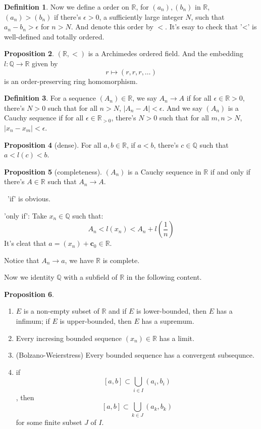 \documentclass[12pt,a4paper]{book}
\newenvironment{prooff}{{\noindent\it\textcolor{cyan!40!black}{Proof}:}\,}{\par}
\newcommand{\bb}[1]{\mathbb{#1}}
\newenvironment{enu}{\begin{enumerate}[(1)]}{\end{enumerate}}
\theoremstyle{definition}
\newtheorem{defn}{Definition}[section]
\newtheorem{prop}[defn]{Proposition}
\begin{document}
\begin{defn}
    Now we define a order on $\bb{R}$, for $(a_n),(b_n)$ in $\bb{R}$, $(a_n)>(b_n)$ if  there's $\epsilon>0$, a sufficiently large integer $N$, such that $a_n-b_n>\epsilon$ for $n>N$. And denote this order by $<$. It's esay to check that '<' is well-defined and
    totally ordered.
\end{defn}
\begin{prop}
    $(\bb{R},<)$ is a Archimedes ordered field. And the embedding $l:\bb{Q}\rightarrow \bb{R}$ given by
    \begin{equation*}
        r\mapsto (r,r,r,\dots)
    \end{equation*}
    is an order-preserving ring homomorphism.
\end{prop}
\begin{defn}
    For a sequence $(A_n)\in \bb{R}$, we say $A_n\rightarrow A$ if for all $\epsilon\in\bb{R}>0$, there's $N>0$ such that for all $n>N$, $|A_n-A|<\epsilon$. And we say $(A_n)$ is a Cauchy sequence if for all $\epsilon \in \bb{R}_{>0}$, there's $N>0$ such that for all $m,n>N$, $|x_n-x_m|<\epsilon$.
\end{defn}
\begin{prop}[dense]
    For all $a,b\in \bb{R}$, if $a<b$, there's $c\in \bb{Q}$ such that $a<l(c)<b$.
\end{prop}
\begin{prop}[completeness]
    $(A_n)$ is a Cauchy sequence in $\bb{R}$ if and only if there's $A\in \bb{R}$ such that $A_n\rightarrow A$.
\end{prop}
\begin{prooff}
    'if' is obvious.

    'only if': Take $x_n\in \mathbb{Q}$ such that:
    $$
        A_n<l(x_n)<A_n+l(\frac{1}{n})
    $$
    It's cleat that $a=(x_n)+\mathbf{c}_0\in \mathbb{R}$.

    Notice that $A_n\rightarrow a$, we have $\bb{R}$ is complete.
\end{prooff}

\vskip 1cm
Now we identity $\bb{Q}$ with a subfield of $\bb{R}$ in the following content.

\begin{prop}
    \begin{enu}
        \item $E$ is a non-empty subset of $\bb{R}$ and if $E$ is lower-bounded, then $E$ has a infimum; if $E$ is upper-bounded, then $E$ has a supremum.
        \item Every incresing bounded sequence $(x_n)\in \bb{R}$ has a limit.
        \item (Bolzano-Weierstress) Every bounded sequence has a convergent subsequnce.
        \item if $$[a,b]\subset \bigcup_{i\in I}(a_i,b_i)$$, then $$[a,b]\subset \bigcup_{k\in J}(a_k,b_k)$$ for some finite subset $J$ of $I$.
    \end{enu}
\end{prop}
\end{document}

